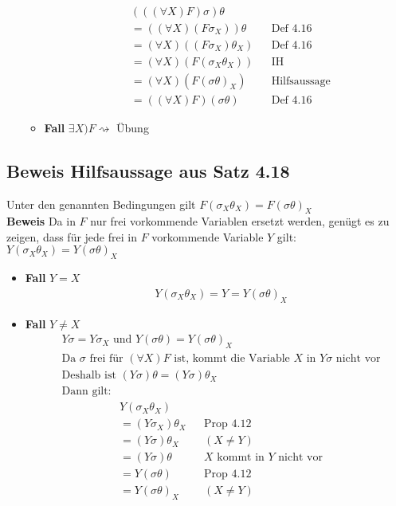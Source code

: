 \begin{itemize}
\begin{itemize}
\begin{align*}
		\end{align*}
		\begin{align*}
		&(((\forall X)F)\sigma)\theta\\&=((\forall X)(F\sigma_{X}))\theta &&\text{Def 4.16} \\&=(\forall X)((F\sigma_{X})\theta_{X}) &&\text{Def 4.16} \\&=(\forall X)(F(\sigma_{X}\theta_{X})) &&\text{IH} \\&=(\forall X)(F(\sigma\theta)_{X})&&\text{Hilfsaussage} \\& = ((\forall X)F)(\sigma\theta) &&\text{Def 4.16}
		\end{align*}
		\item \textbf{Fall} \(\exists X)F \rightsquigarrow\) Übung
	\end{itemize}
\end{itemize}

\subsection{Beweis Hilfsaussage aus Satz 4.18}
Unter den genannten Bedingungen gilt \(F(\sigma_{X}\theta_{X}) = F(\sigma\theta)_{X} \)\\ \textbf{Beweis} Da in \(F\) nur frei vorkommende Variablen ersetzt werden, genügt es zu zeigen, dass für jede frei in \(F\) vorkommende Variable \(Y\) gilt: \(Y(\sigma_{X}\theta_{X}) = Y(\sigma\theta)_{X} \)
\begin{itemize}
	\item \textbf{Fall} \(Y = X\)
	\begin{align*}
		&Y(\sigma_{X}\theta_{X}) = Y = Y(\sigma\theta)_{X}
	\end{align*}
	\item \textbf{Fall} \(Y \ne X\)
	\begin{align*}
	&Y\sigma = Y\sigma_{X} \text{ und } Y(\sigma\theta) = Y(\sigma\theta)_{X}\\&\text{Da }\sigma \text{ frei für } (\forall X)F \text{ ist, kommt die Variable } X \text{ in } Y\sigma \text{ nicht vor}\\&\text{Deshalb ist } (Y\sigma)\theta = (Y\sigma)\theta_{X} \\&\text{Dann gilt:}
	\end{align*}
	\begin{align*}
	&Y(\sigma_{X}\theta_{X})\\&=(Y\sigma_{X})\theta_{X} &&\text{Prop 4.12}\\&=(Y\sigma)\theta_{X} && (X \ne Y)\\&=(Y\sigma)\theta && X \text{ kommt in } Y \text{ nicht vor}\\&= Y(\sigma\theta) &&\text{Prop 4.12}\\&= Y(\sigma\theta)_{X} && (X \ne Y)\\&
	\end{align*}
\end{itemize}

